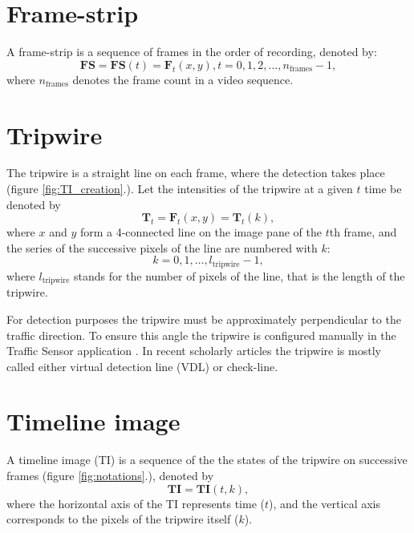 \section{Frame-strip}
A frame-strip is a sequence of frames in the order of recording, denoted by:
\begin{displaymath}
	\boldsymbol{FS}=\boldsymbol{FS}(t)=\boldsymbol{F}_t(x,y),
	t=0,1,2,\dotsc,n_{\text{frames}}-1,
\end{displaymath}
where $n_{\text{frames}}$ denotes the frame count in a video sequence.
\section{Tripwire}
The tripwire is a straight line on each frame, where the detection takes place (figure \ref{fig:TI_creation}.).
Let the intensities of the tripwire at a given $t$ time be denoted by 
\begin{displaymath}
\boldsymbol{T}_t=\boldsymbol{F}_t(x,y)=\boldsymbol{T}_t(k),
\end{displaymath}
where $x$ and $y$ form a 4-connected line on the image pane of the $t$th frame, and the series of the successive pixels of the line are numbered with $k$:
\begin{displaymath}
	k=0,1,\dotsc,l_{\text{tripwire}}-1,
\end{displaymath}
where $l_{\text{tripwire}}$ stands for the number of pixels of the line, that is the length of the tripwire.

For detection purposes the tripwire must be approximately perpendicular to the traffic direction.
To ensure this angle the tripwire is configured manually in the Traffic Sensor application .
In recent scholarly articles the tripwire is mostly called either virtual detection line (VDL) or check-line.
\section{Timeline image}
A timeline image (TI) is a sequence of the the states of the tripwire on successive frames (figure \ref{fig:notations}.), denoted by
\begin{displaymath}
	\boldsymbol{TI}=\boldsymbol{TI}(t,k),
\end{displaymath}
where the horizontal axis of the TI represents time ($t$), and the vertical axis corresponds to the pixels of the tripwire itself ($k$).
 
